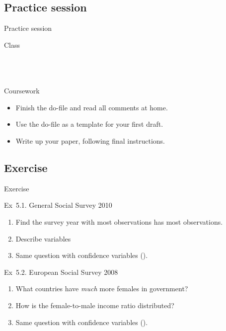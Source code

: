 \documentclass[t]{beamer}
\begin{document}
	\subsection{Practice session}
  
	\begin{frame}[t]{Practice session}

    \begin{block}{Class}
      \\
      \\
      
			\\
			\\    
    \end{block}

    \begin{alertblock}{Coursework}
      \begin{itemize}
	       \item Finish the do-file and read all comments at home.
	       \item Use the do-file as a template for your first draft.
	       \item Write up your paper, following final instructions.
      \end{itemize}
    \end{alertblock}
    		
	\end{frame}
	
  \subsection{Exercise}
  
  \begin{frame}{Exercise}

    \begin{exampleblock}{Ex~5.1. General Social Survey 2010}
      \begin{enumerate}
        \item Find the survey year with most observations  has most observations.
        \item Describe variables 
        \item Same question with confidence variables ().
      \end{enumerate}
    \end{exampleblock}

    \begin{exampleblock}{Ex~5.2. European Social Survey 2008}
      \begin{enumerate}
        \item What countries have \emph{much} more females in government?
        \item How is the female-to-male income ratio distributed?
        \item Same question with confidence variables ().
      \end{enumerate}
    \end{exampleblock}

  \end{frame}
\end{document}
